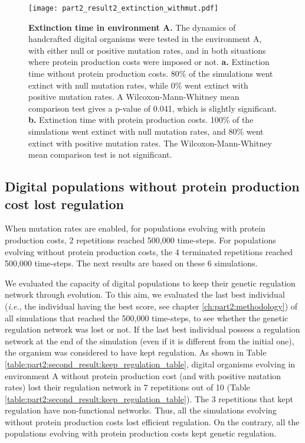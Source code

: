 \begin{figure}[!h]
\centering
\texttt{[image: part2\_result2\_extinction\_withmut.pdf]}
\caption[Extinction time in environment A.]
{\textbf{Extinction time in environment A.}
The dynamics of handcrafted digital organisms were tested in the environment A, with either null or positive mutation rates, and in both situations where protein production costs were imposed or not.
\textbf{a.} Extinction time without protein production costs. 80\% of the simulations went extinct with null mutation rates, while 0\% went extinct with positive mutation rates. A Wilcoxon-Mann-Whitney mean comparison test gives a p-value of 0.041, which is slightly significant.
\textbf{b.} Extinction time with protein production costs. 100\% of the simulations went extinct with null mutation rates, and 80\% went extinct with positive mutation rates. The Wilcoxon-Mann-Whitney mean comparison test is not significant.}
\label{fig:part2:second_result:extinction_withmut}
\end{figure}


\subsection{Digital populations without protein production cost lost regulation}
\label{subsec:part2:second_result:lose_regulation}

When mutation rates are enabled, for populations evolving with protein production costs, 2 repetitions reached 500,000 time-steps. For populations evolving without protein production costs, the 4 terminated repetitions reached 500,000 time-steps. The next results are based on these 6 simulations.

We evaluated the capacity of digital populations to keep their genetic regulation network through evolution. To this aim, we evaluated the last best individual (\textit{i.e.}, the individual having the best score, see chapter \ref{ch:part2:methodology}) of all simulations that reached the 500,000 time-steps, to see whether the genetic regulation network was lost or not.
If the last best individual possess a regulation network at the end of the simulation (even if it is different from the initial one), the organism was considered to have kept regulation. As shown in Table \ref{table:part2:second_result:keep_regulation_table}, digital organisms evolving in environment A without protein production cost (and with positive mutation rates) lost their regulation network in 7 repetitions out of 10 (Table \ref{table:part2:second_result:keep_regulation_table}). The 3 repetitions that kept regulation have non-functional networks. Thus, all the simulations evolving without protein production costs lost efficient regulation. On the contrary, all the populations evolving with protein production costs kept genetic regulation.

